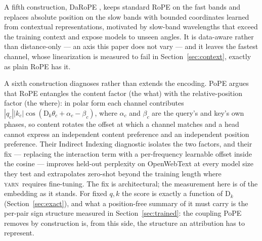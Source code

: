 \documentclass{article}
\theoremstyle{plain}
\theoremstyle{remark}
\newcommand{\yarn}{\textsc{yarn}}
\newcommand{\D}{\mathrm{D}_k}
\begin{document}
A fifth construction, DaRoPE \citep{levy2026darope}, keeps standard RoPE on the
fast bands and replaces absolute position on the slow bands with bounded
coordinates learned from contextual representations, motivated by slow-band
wavelengths that exceed the training context and expose models to unseen
angles. It is data-aware rather than distance-only --- an axis this paper does
not vary --- and it leaves the fastest channel, whose linearization is measured
to fail in Section~\ref{sec:context}, exactly as plain RoPE has it.

A sixth construction diagnoses rather than extends the encoding. PoPE
\citep{gopalakrishnan2026pope} argues that RoPE entangles the content factor
(the what) with the relative-position factor (the where): in polar form each
channel contributes $|q_c||k_c|\cos(\D\theta_c + \alpha_c - \beta_c)$, where
$\alpha_c$ and $\beta_c$ are the query's and key's own phases, so content
rotates the offset at which a channel matches and a head cannot express an
independent content preference and an independent position preference. Their
Indirect Indexing diagnostic isolates the two factors, and their fix ---
replacing the interaction term with a per-frequency learnable offset inside
the cosine --- improves held-out perplexity on OpenWebText at every model
size they test and extrapolates zero-shot beyond the training
length where \yarn\ requires fine-tuning. The fix is architectural; the
measurement here is of the embedding as it stands. For fixed $q,k$ the score
is exactly a function of $\D$ (Section~\ref{sec:exact}), and what a
position-free summary of it must carry is the per-pair sign structure
measured in Section~\ref{sec:trained}: the coupling PoPE removes by
construction is, from this side, the structure an attribution has to
represent.
\end{document}
